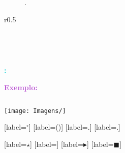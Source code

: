 \begin{figure}[h]
    \centering
    \caption{.}
    \label{fig:}
\end{figure}

\begin{wrapfigure}{r}{0.5\textwidth}
    \centering
    \caption{}
    \label{fig:}
\end{wrapfigure}

\begin{figure}[h]
    \centering
     \\ %
    \caption{}
    \label{fig:}
\end{figure}
  
 \\ %


\textcolor{MediumOrchid}{\textbf{}}

\ce{^{}}

\textcolor{DarkTurquoise}{\textbf{:}}

\textcolor{MediumOrchid}{\textbf{Exemplo:}}


\textcolor{CarnationPink}{$$}

\begin{center}
\texttt{[image: Imagens/]}
\end{center}

[label=\textcolor{CarnationPink}{\arabic*${}^\circ$}]
[label=\textcolor{CarnationPink}{(\alph*)}]
[label=\textcolor{CarnationPink}{\roman*.}]
[label=\textcolor{CarnationPink}{\arabic*.}]

[label=\textcolor{CarnationPink}{$\star$}]
[label=\textcolor{CarnationPink}{\textopenbullet}]
[label=\textcolor{CarnationPink}{$\blacktriangleright$}]
[label=\textcolor{CarnationPink}{$\blacksquare$}]


\textcolor{CarnationPink}{$\mathbf{}$}

\textcolor{DarkTurquoise}{\textbf{}}


\begin{tcolorbox}[width=\textwidth, colback={white}, colbacktitle={DarkTurquoise!50!white}, title={$\bigstar$ \LobsterTwo{Observação} $\bigstar $}, coltitle={CarnationPink}, colframe={DarkTurquoise}, fonttitle=\rmfamily\bfseries\Large]

\end{tcolorbox}

